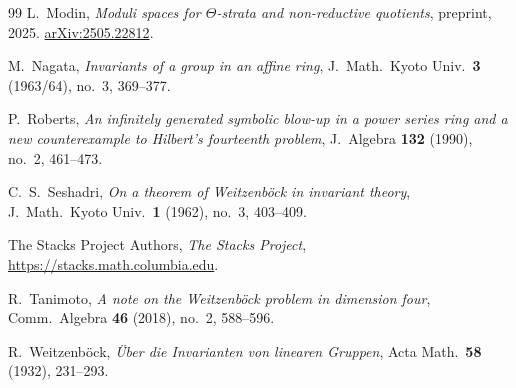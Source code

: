 \documentclass[11pt]{amsart}
\theoremstyle{plain}
\numberwithin{equation}{section}
\begin{document}
\begin{thebibliography}{99}
L.~Modin, \emph{Moduli spaces for \(\Theta\)-strata and non-reductive
quotients}, preprint, 2025.
\href{https://arxiv.org/abs/2505.22812}{arXiv:2505.22812}.

M.~Nagata, \emph{Invariants of a group in an affine ring},
J.\ Math.\ Kyoto Univ.\ \textbf{3} (1963/64), no.~3, 369--377.

P.~Roberts, \emph{An infinitely generated symbolic blow-up in a power series
ring and a new counterexample to Hilbert's fourteenth problem},
J.\ Algebra \textbf{132} (1990), no.~2, 461--473.

C.~S.~Seshadri, \emph{On a theorem of Weitzenb\"ock in invariant theory},
J.\ Math.\ Kyoto Univ.\ \textbf{1} (1962), no.~3, 403--409.

The Stacks Project Authors, \emph{The Stacks Project},
\url{https://stacks.math.columbia.edu}.

R.~Tanimoto, \emph{A note on the Weitzenb\"ock problem in dimension four},
Comm.\ Algebra \textbf{46} (2018), no.~2, 588--596.

R.~Weitzenb\"ock, \emph{\"Uber die Invarianten von linearen Gruppen},
Acta Math.\ \textbf{58} (1932), 231--293.

\end{thebibliography}
\end{document}
